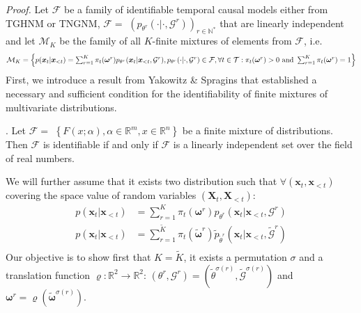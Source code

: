 \textit{Proof. }Let $\mathcal{F}$ be a family of identifiable temporal causal models either from TGHNM or TNGNM, $\mathcal{F}=$ $\left(p_{\theta^r}(\cdot| \cdot,\mathcal{G}^r)\right)_{r \in \mathbb{N}^*}$ that are linearly independent and let $\mathcal{M}_K$ be the family of all $K$-finite mixtures of elements from $\mathcal{F}$, i.e.
\begin{equation*}
 \scalebox{0.9}{$\mathcal{M}_K =
\left\{p(\boldsymbol{x}_t|\boldsymbol{x}_{<t}) =  \sum_{r=1}^K\pi_t(\boldsymbol{\omega}^r)p_{\theta^r}(\boldsymbol{x}_t|\boldsymbol{x}_{<t},\mathcal{G}^r), p_{\theta^r}(\cdot|\cdot, \mathcal{G}^r) \in \mathcal{F}, \forall t \in \mathcal{T}: \pi_t(\boldsymbol{\omega}^r)>0 \text{ and }\sum_{r=1}^K \pi_t(\boldsymbol{\omega}^r)=1\right\}
$}   
\end{equation*}
First, we introduce a result from Yakowitz \& Spragins \citep{yakowitz1968identifiability} that established a necessary and sufficient condition for the identifiability of finite mixtures of multivariate distributions.
\begin{theorem}. Let $\mathcal{F}=$ $\left\{F(x ; \alpha), \alpha \in \mathbb{R}^m, x \in \mathbb{R}^n\right\}$ be a finite mixture of distributions. Then $\mathcal{F}$ is identifiable if and only if $\mathcal{F}$ is a linearly independent set over the field of real numbers.
\label{theo_yako}
\end{theorem}
We will further assume that it exists two distribution such that $\forall (\boldsymbol{x}_t,\boldsymbol{x}_{<t})$ covering the space value of random variables $(\boldsymbol{X}_t,\boldsymbol{X}_{<t})$:
\begin{equation}
    \begin{aligned}
        p(\boldsymbol{x}_t|\boldsymbol{x}_{<t}) &=  \sum_{r=1}^K\pi_t(\boldsymbol{\omega}^r)p_{\theta^r}(\boldsymbol{x}_t|\boldsymbol{x}_{<t},\mathcal{G}^r)\\
        p(\boldsymbol{x}_t|\boldsymbol{x}_{<t}) &=  \sum_{r=1}^{\tilde{K}}\pi_t(\boldsymbol{\tilde{\omega}}^r)\tilde{p}_{\tilde{\theta}^r}(\boldsymbol{x}_t|\boldsymbol{x}_{<t},\tilde{\mathcal{G}}^r)\\
    \end{aligned}
    \label{eq_2_dist_proof}
\end{equation}
Our objective is to show first that $K = \tilde{K}$, it exists a permutation $\sigma$ and a translation function $\varrho: \mathbb{R}^2 \rightarrow \mathbb{R}^2$: $(\theta^r, \mathcal{G}^r) = (\tilde{\theta}^{\sigma(r)}, \tilde{\mathcal{G}}^{\sigma(r)})$ and $\boldsymbol{\omega}^r = \varrho(\tilde{\boldsymbol{\omega}}^{\sigma(r)})$.

